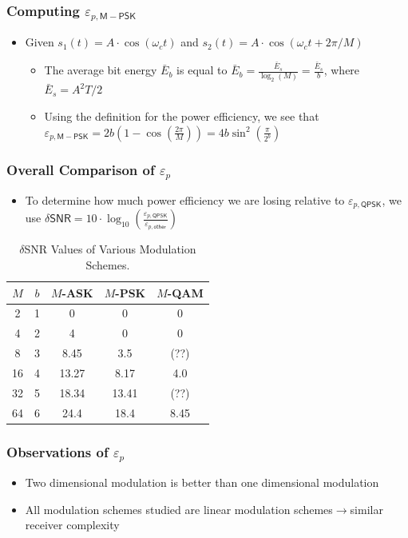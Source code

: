 \documentclass[10pt]{beamer}
\begin{document}
\frame
{
  \frametitle{Computing $\varepsilon_{p,\mathsf{M-PSK}}$}
  
  \begin{itemize}
      \item Given $s_1(t)=A\cdot\cos(\omega_ct)$ and $s_2(t)=A\cdot\cos(\omega_ct+2\pi/M)$
    \begin{itemize} 
           \item The average bit energy $\bar{E}_b$ is equal to $\bar{E}_b=\frac{\bar{E}_s}{\log_{2}(M)}=\frac{\bar{E}_s}{b}$, where $\bar{E}_s=A^2T/2$
        \item Using the definition for the power efficiency, we see that $\varepsilon_{p,\mathsf{M-PSK}}=2b(1-\cos(\frac{2\pi}{M}))=4b\sin^2(\frac{\pi}{2^b})$
     \end{itemize}
  \end{itemize}
  
  
}

\frame
{
  \frametitle{Overall Comparison of $\varepsilon_{p}$}

    \begin{itemize}
        \item To determine how much power efficiency we are losing relative to $\varepsilon_{p,\mathsf{QPSK}}$, we use $\delta\mathsf{SNR}=10\cdot\log_{10}(\frac{\varepsilon_{p,\mathsf{QPSK}}}{\varepsilon_{p,\mathsf{other}}})$
    \end{itemize}
    \begin{table}[h]
    \caption{$\delta$SNR Values of Various Modulation Schemes.}
    \begin{tabular}{ccccc}
      \hline
      $M$ & $b$ & $M$-ASK & $M$-PSK & $M$-QAM \\
      \hline
      2  & 1 &  0    &  0    & 0 \\
      4  & 2 &  4    &  0    & 0 \\
      8  & 3 &  8.45 &  3.5  & (??) \\
      16 & 4 & 13.27 &  8.17 & 4.0 \\
      32 & 5 & 18.34 & 13.41 & (??) \\
      64 & 6 & 24.4  & 18.4  & 8.45 \\
      \hline
    \end{tabular}
    \end{table}

}
\frame
{
  \frametitle{Observations of $\varepsilon_{p}$}

    \begin{itemize}
        \item Two dimensional modulation is better than one dimensional modulation
        \item All modulation schemes studied are linear modulation schemes$\rightarrow$similar receiver complexity
    \end{itemize}
    
}
\end{document}
